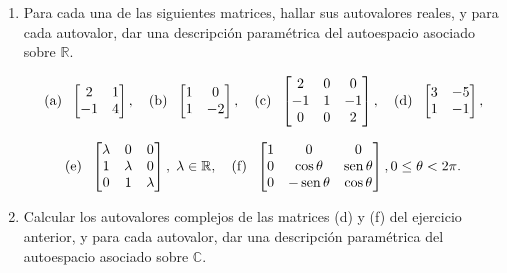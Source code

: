 \documentclass[a4paper,12pt,twoside,spanish,reqno]{amsbook}
\numberwithin{equation}{section}
\begin{document}
\begin{enumerate}[topsep=6pt,itemsep=.4cm]


\item\label{autovalores} Para cada una de las siguientes matrices, hallar sus autovalores reales, y para cada autovalor, dar una descripción paramétrica del autoespacio asociado sobre $\mathbb{R}$.

$$
\textrm{(a)\; } \left[\begin{matrix} 2 & 1\\ -1 & 4 \end{matrix} \right],
\quad
\textrm{(b)\; }
\left[\begin{matrix} 1 & 0\\ 1 & -2 \end{matrix} \right],
\quad \textrm{(c)\; } \left[\begin{matrix}2 & 0 & 0\\ -1 & 1& -1\\ 0 & 0 & 2 \end{matrix} \right] ,\quad
\textrm{(d)\; } \begin{bmatrix} 3 & -5 \\ 1 & -1 \end{bmatrix},
$$

$$
\textrm{(e)\; } \begin{bmatrix} \lambda & 0 & 0 \\ 1 & \lambda & 0\\ 0 & 1 & \lambda \\ \end{bmatrix}, \; \lambda\in \mathbb R,\quad
\textrm{(f)\; } \left[\begin{matrix}1 & 0& 0 \\ 0 & \cos\theta & \operatorname{sen}\theta\\ 0 & -\operatorname{sen}\theta & \cos\theta \end{matrix} \right], 0\leq \theta<2\pi.
$$ 


\item\label{autovalores-complejos} Calcular los autovalores complejos de las matrices (d) y (f) del ejercicio anterior, y para cada autovalor, dar una descripción paramétrica del autoespacio asociado sobre $\mathbb{C}$.
\end{enumerate}
\end{document}

